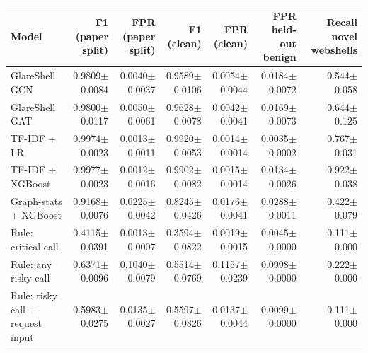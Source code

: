 \begin{tabular}{@{}lrrrrrr@{}}
\toprule
Model & F1 (paper split) & FPR (paper split) & F1 (clean) & FPR (clean) & FPR held-out benign & Recall novel webshells \\ \midrule
GlareShell GCN & 0.9809$\pm$0.0084 & 0.0040$\pm$0.0037 & 0.9589$\pm$0.0106 & 0.0054$\pm$0.0044 & 0.0184$\pm$0.0072 & 0.544$\pm$0.058 \\
GlareShell GAT & 0.9800$\pm$0.0117 & 0.0050$\pm$0.0061 & 0.9628$\pm$0.0078 & 0.0042$\pm$0.0041 & 0.0169$\pm$0.0073 & 0.644$\pm$0.125 \\
TF-IDF + LR & 0.9974$\pm$0.0023 & 0.0013$\pm$0.0011 & 0.9920$\pm$0.0053 & 0.0014$\pm$0.0014 & 0.0035$\pm$0.0002 & 0.767$\pm$0.031 \\
TF-IDF + XGBoost & 0.9977$\pm$0.0023 & 0.0012$\pm$0.0016 & 0.9902$\pm$0.0082 & 0.0015$\pm$0.0014 & 0.0134$\pm$0.0026 & 0.922$\pm$0.038 \\
Graph-stats + XGBoost & 0.9168$\pm$0.0076 & 0.0225$\pm$0.0042 & 0.8245$\pm$0.0426 & 0.0176$\pm$0.0041 & 0.0288$\pm$0.0011 & 0.422$\pm$0.079 \\
Rule: critical call & 0.4115$\pm$0.0391 & 0.0013$\pm$0.0007 & 0.3594$\pm$0.0822 & 0.0019$\pm$0.0015 & 0.0045$\pm$0.0000 & 0.111$\pm$0.000 \\
Rule: any risky call & 0.6371$\pm$0.0096 & 0.1040$\pm$0.0079 & 0.5514$\pm$0.0769 & 0.1157$\pm$0.0239 & 0.0998$\pm$0.0000 & 0.222$\pm$0.000 \\
Rule: risky call + request input & 0.5983$\pm$0.0275 & 0.0135$\pm$0.0027 & 0.5597$\pm$0.0826 & 0.0137$\pm$0.0044 & 0.0099$\pm$0.0000 & 0.111$\pm$0.000 \\
\bottomrule
\end{tabular}
